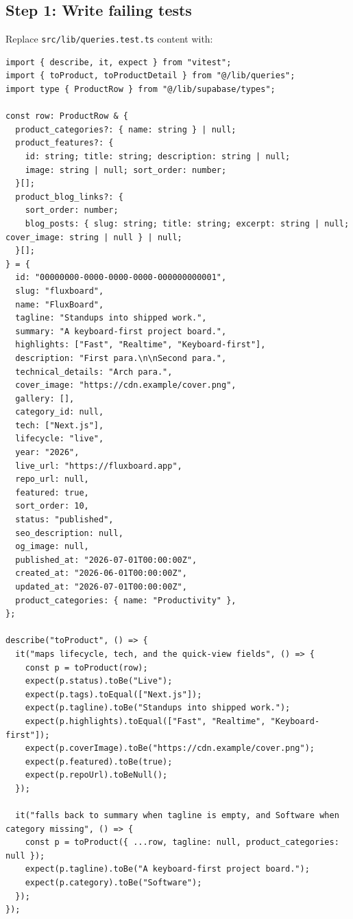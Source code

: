 \documentclass[11pt,a4paper]{article}
\begin{document}
\subsection*{Step 1: Write failing tests}

Replace \texttt{src/lib/queries.test.ts} content with:

\begin{lstlisting}
import { describe, it, expect } from "vitest";
import { toProduct, toProductDetail } from "@/lib/queries";
import type { ProductRow } from "@/lib/supabase/types";

const row: ProductRow & {
  product_categories?: { name: string } | null;
  product_features?: {
    id: string; title: string; description: string | null;
    image: string | null; sort_order: number;
  }[];
  product_blog_links?: {
    sort_order: number;
    blog_posts: { slug: string; title: string; excerpt: string | null; cover_image: string | null } | null;
  }[];
} = {
  id: "00000000-0000-0000-0000-000000000001",
  slug: "fluxboard",
  name: "FluxBoard",
  tagline: "Standups into shipped work.",
  summary: "A keyboard-first project board.",
  highlights: ["Fast", "Realtime", "Keyboard-first"],
  description: "First para.\n\nSecond para.",
  technical_details: "Arch para.",
  cover_image: "https://cdn.example/cover.png",
  gallery: [],
  category_id: null,
  tech: ["Next.js"],
  lifecycle: "live",
  year: "2026",
  live_url: "https://fluxboard.app",
  repo_url: null,
  featured: true,
  sort_order: 10,
  status: "published",
  seo_description: null,
  og_image: null,
  published_at: "2026-07-01T00:00:00Z",
  created_at: "2026-06-01T00:00:00Z",
  updated_at: "2026-07-01T00:00:00Z",
  product_categories: { name: "Productivity" },
};

describe("toProduct", () => {
  it("maps lifecycle, tech, and the quick-view fields", () => {
    const p = toProduct(row);
    expect(p.status).toBe("Live");
    expect(p.tags).toEqual(["Next.js"]);
    expect(p.tagline).toBe("Standups into shipped work.");
    expect(p.highlights).toEqual(["Fast", "Realtime", "Keyboard-first"]);
    expect(p.coverImage).toBe("https://cdn.example/cover.png");
    expect(p.featured).toBe(true);
    expect(p.repoUrl).toBeNull();
  });

  it("falls back to summary when tagline is empty, and Software when category missing", () => {
    const p = toProduct({ ...row, tagline: null, product_categories: null });
    expect(p.tagline).toBe("A keyboard-first project board.");
    expect(p.category).toBe("Software");
  });
});


\end{lstlisting}
\end{document}
